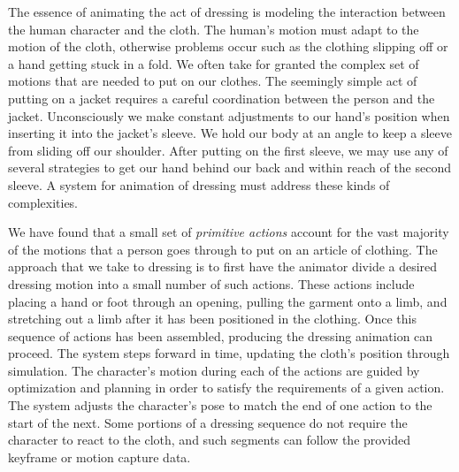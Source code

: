 

The essence of animating the act of dressing is modeling the
interaction between the human character and the cloth.  The human's motion
must adapt to the motion of the cloth, otherwise problems occur such as the
clothing slipping off or a hand getting stuck in a fold.  We often take
for granted the complex set of motions that are needed to put on our
clothes.  The seemingly simple act of putting on a jacket requires a
careful coordination between the person and the jacket.  Unconsciously we
make constant adjustments to our hand’s position when inserting it into
the jacket’s sleeve.  We hold our body at an angle to keep a sleeve from
sliding off our shoulder.  After putting on the first sleeve, we may use
any of several strategies to get our hand behind our back and within reach
of the second sleeve.  A system for animation of dressing must address
these kinds of complexities.

We have found that a small set of \emph{primitive actions} account for the vast
majority of the motions that a person goes through to put on an article of
clothing.  The approach that we take to dressing is to first have the
animator divide a desired dressing motion into a small number of such
actions.  These actions include placing a hand or foot through an opening,
pulling the garment onto a limb, and stretching out a limb after it has
been positioned in the clothing.  Once this sequence of actions has been
assembled, producing the dressing animation can proceed.  The system steps
forward in time, updating the cloth's position through simulation.  The
character's motion during each of the actions are guided by optimization
and planning in order to satisfy the requirements of a given
action. The system adjusts the character's pose to match the end of one
action to the start of the next. Some portions of a dressing sequence do
not require the character to react to the cloth, and such segments can follow
the provided keyframe or motion capture data.

